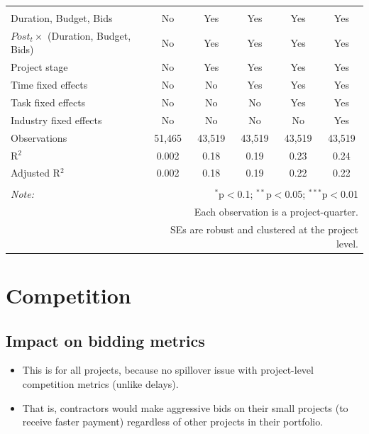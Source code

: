 \documentclass[
]{article}
\providecommand{\tightlist}{%
  \setlength{\itemsep}{0pt}\setlength{\parskip}{0pt}}
\begin{document}
\begin{table}[H]
\begin{tabular}{@{\extracolsep{-2pt}}lccccc}
  & & & & & \\ 
\hline \\[-1.8ex] 
Duration, Budget, Bids & No & Yes & Yes & Yes & Yes \\ 
$Post_t \times $  (Duration, Budget, Bids) & No & Yes & Yes & Yes & Yes \\ 
Project stage & No & Yes & Yes & Yes & Yes \\ 
Time fixed effects & No & No & Yes & Yes & Yes \\ 
Task fixed effects & No & No & No & Yes & Yes \\ 
Industry fixed effects & No & No & No & No & Yes \\ 
Observations & 51,465 & 43,519 & 43,519 & 43,519 & 43,519 \\ 
R$^{2}$ & 0.002 & 0.18 & 0.19 & 0.23 & 0.24 \\ 
Adjusted R$^{2}$ & 0.002 & 0.18 & 0.19 & 0.22 & 0.22 \\ 
\hline 
\hline \\[-1.8ex] 
\textit{Note:}  & \multicolumn{5}{r}{$^{*}$p$<$0.1; $^{**}$p$<$0.05; $^{***}$p$<$0.01} \\ 
 & \multicolumn{5}{r}{Each observation is a project-quarter.} \\ 
 & \multicolumn{5}{r}{SEs are robust and clustered at the project level.} \\ 
\end{tabular} 
\end{table}

\hypertarget{competition}{%
\section{Competition}\label{competition}}

\hypertarget{impact-on-bidding-metrics}{%
\subsection{Impact on bidding metrics}\label{impact-on-bidding-metrics}}

\begin{itemize}
\tightlist
\item
  This is for all projects, because no spillover issue with
  project-level competition metrics (unlike delays).
\item
  That is, contractors would make aggressive bids on their small
  projects (to receive faster payment) regardless of other projects in
  their portfolio.
\end{itemize}
\end{document}
